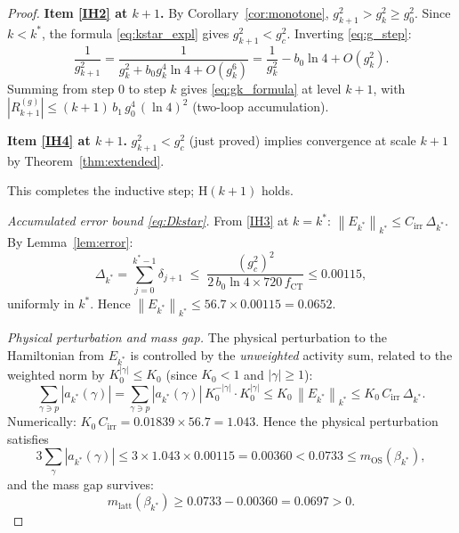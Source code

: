 \documentclass[11pt,a4paper]{amsart}
\theoremstyle{definition}
\newcommand{\norm}[1]{\left\|#1\right\|}
\newcommand{\gB}{g^2_c}
\newcommand{\CT}{\mathrm{CT}}
\begin{document}
\begin{proof}
\smallskip\noindent
\textbf{Item \ref{IH2} at $k+1$.}
By Corollary~\ref{cor:monotone}, $g^2_{k+1} > g^2_k \ge g^2_0$.
Since $k < k^*$, the formula \eqref{eq:kstar_expl} gives
$g^2_{k+1} < \gB$.  Inverting \eqref{eq:g_step}:
\[
  \frac{1}{g^2_{k+1}}
  = \frac{1}{g^2_k + b_0 g^4_k\ln 4 + O(g^6_k)}
  = \frac{1}{g^2_k} - b_0\ln 4 + O(g^2_k).
\]
Summing from step $0$ to step $k$ gives \eqref{eq:gk_formula} at level $k+1$,
with $|R^{(g)}_{k+1}| \le (k+1)\,b_1\,g^4_0\,(\ln 4)^2$ (two-loop
accumulation). \checkmark

\smallskip\noindent
\textbf{Item \ref{IH4} at $k+1$.}
$g^2_{k+1} < \gB$ (just proved) implies convergence at scale $k+1$
by Theorem~\ref{thm:extended}. \checkmark

\medskip
This completes the inductive step; $\mathrm{H}(k+1)$ holds. \checkmark

\medskip
\textit{Accumulated error bound \eqref{eq:Dkstar}.}
From \ref{IH3} at $k = k^*$: $\norm{E_{k^*}}_{k^*} \le C_{\mathrm{irr}}\,\Delta_{k^*}$.
By Lemma~\ref{lem:error}:
\[
  \Delta_{k^*}
  = \sum_{j=0}^{k^*-1} \delta_{j+1}
  \;\le\;
  \frac{(\gB)^2}{2\,b_0\ln 4 \times 720\,f_{\CT}}
  \le 0.00115,
\]
uniformly in $k^*$.  Hence $\norm{E_{k^*}}_{k^*} \le 56.7 \times 0.00115 = 0.0652$.

\medskip
\textit{Physical perturbation and mass gap.}
The physical perturbation to the Hamiltonian from $E_{k^*}$ is controlled by
the \emph{unweighted} activity sum, related to the weighted norm by
$K_0^{|\gamma|} \le K_0$ (since $K_0 < 1$ and $|\gamma| \ge 1$):
\[
  \sum_{\gamma\ni p}|a_{k^*}(\gamma)|
  = \sum_{\gamma\ni p}|a_{k^*}(\gamma)|\,K_0^{-|\gamma|}\cdot K_0^{|\gamma|}
  \le K_0\,\norm{E_{k^*}}_{k^*}
  \le K_0\,C_{\mathrm{irr}}\,\Delta_{k^*}.
\]
Numerically: $K_0\,C_{\mathrm{irr}} = 0.01839\times 56.7 = 1.043$.
Hence the physical perturbation satisfies
\[
  3\sum_\gamma|a_{k^*}(\gamma)|
  \le 3\times 1.043\times 0.00115
  = 0.00360
  < 0.0733
  \le m_{\mathrm{OS}}(\beta_{k^*}),
\]
and the mass gap survives:
\[
  m_{\mathrm{latt}}(\beta_{k^*})
  \ge 0.0733 - 0.00360
  = 0.0697 > 0.
\]
\end{proof}
\end{document}
